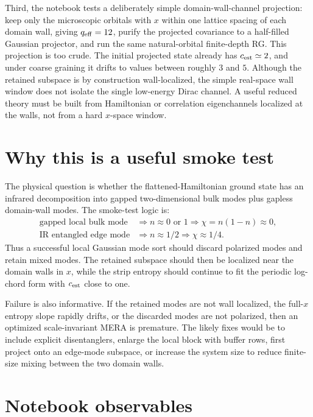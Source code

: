 \documentclass[aps,prb,twocolumn,floatfix]{revtex4-2}
\begin{document}
Third, the notebook tests a deliberately simple domain-wall-channel projection:
keep only the microscopic orbitals with \(x\) within one lattice spacing of
each domain wall, giving \(q_{\rm eff}=12\), purify the projected covariance to
a half-filled Gaussian projector, and run the same natural-orbital finite-depth
RG.  This projection is too crude.  The initial projected state already has
\(c_{\rm est}\simeq2\), and under coarse graining it drifts to values between
roughly \(3\) and \(5\).  Although the retained subspace is by construction
wall-localized, the simple real-space wall window does not isolate the single
low-energy Dirac channel.  A useful reduced theory must be built from
Hamiltonian or correlation eigenchannels localized at the walls, not from a
hard \(x\)-space window.

\section{Why this is a useful smoke test}

The physical question is whether the flattened-Hamiltonian ground state has an
infrared decomposition into gapped two-dimensional bulk modes plus gapless
domain-wall modes.  The smoke-test logic is:
\begin{align}
  \text{gapped local bulk mode}
  &\Longrightarrow n\approx0 \text{ or }1
  \Longrightarrow \chi=n(1-n)\approx0,
  \\
  \text{IR entangled edge mode}
  &\Longrightarrow n\approx1/2
  \Longrightarrow \chi\approx1/4.
\end{align}
Thus a successful local Gaussian mode sort should discard polarized modes and
retain mixed modes.  The retained subspace should then be localized near the
domain walls in \(x\), while the strip entropy should continue to fit the
periodic log-chord form with \(c_{\rm est}\) close to one.

Failure is also informative.  If the retained modes are not wall localized, the
full-\(x\) entropy slope rapidly drifts, or the discarded modes are not
polarized, then an optimized scale-invariant MERA is premature.  The likely
fixes would be to include explicit disentanglers, enlarge the local block with
buffer rows, first project onto an edge-mode subspace, or increase the system
size to reduce finite-size mixing between the two domain walls.

\section{Notebook observables}
\end{document}
